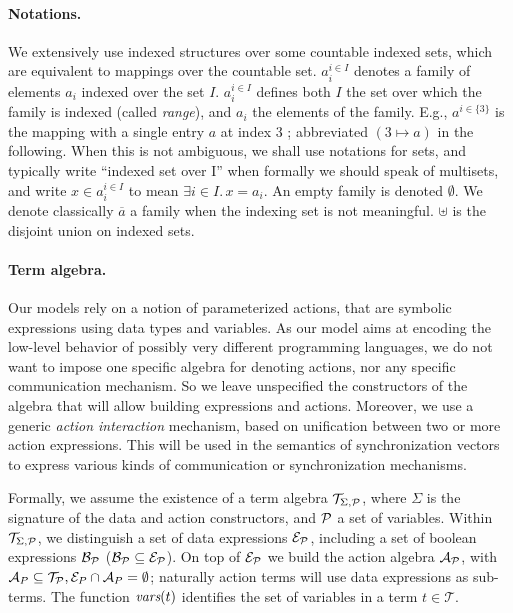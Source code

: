 \documentclass{lncs/llncs}
\def\AlgT{\mathcal{T}}
\begin{document}
\paragraph*{Notations.}
We extensively use indexed structures
over some countable indexed sets, which are equivalent to mappings over
the countable set. %
$a_i^{i\in I}$
denotes a family of elements $a_i$ indexed over the
set $I$. %
$a_i^{i\in I}$ defines both $I$ the set over which the family is
indexed (called \emph{range}), and $a_i$ the elements of the family.
E.g., $a^{i\in\{3\}}$ is the mapping with a single entry $a$ at index
$3$ ; abbreviated $(3\mapsto a)$ in the following.
When this is not
ambiguous, we shall use notations for sets, and typically write
``indexed set over I'' when formally we should speak of multisets, and
write $x\in a_i^{i\in I}$ to mean $\exists i\in I.\, x=a_i$.  An empty
family is denoted $\emptyset$. We
denote classically $\overline{a}$ a family when the indexing set is
not meaningful.  $\uplus$ is the disjoint union on
indexed sets.


\paragraph*{Term algebra.}
Our models rely on a notion of parameterized actions, that are
symbolic expressions using data types and variables. As our model aims
at encoding the low-level behavior of possibly very different
programming languages, we do not want to impose one specific algebra
for denoting actions, nor any specific communication mechanism. So we
leave unspecified the constructors of the algebra that will allow building
expressions and actions. Moreover, we use a generic {\em action interaction}
mechanism, based on unification between two or more action
expressions. This will be used in the semantics of synchronization
vectors to express various kinds of communication or synchronization mechanisms.

\def\Talg{\mathcal{T}_{\Sigma,\P}}
Formally, we assume the existence of a term algebra $\Talg$,
where $\Sigma$ is the signature of the data and action constructors,
and $\P$ a set of variables. Within $\Talg$, we distinguish a set of
data expressions $\mathcal{E}_\P$, including a set of boolean
expressions $\mathcal{B}_{\P}$ ($\mathcal{B}_{\P}\subseteq\mathcal{E}_\P$).
On top of $\mathcal{E}_\P$ we build the action algebra
$\mathcal{A}_\P$, with $\mathcal{A}_P\subseteq\mathcal{T}_\P,
\mathcal{E}_P\cap\mathcal{A}_P=\emptyset$;
naturally action terms will use data expressions as sub-terms.
The function $\vars(t)$ identifies the set of variables in a term
$t\in\AlgT$.
\end{document}
